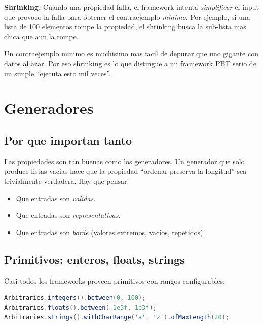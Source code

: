 \documentclass[12pt,a4paper]{article}
\begin{document}
\begin{definicionbox}
\textbf{Shrinking.} Cuando una propiedad falla, el framework intenta \emph{simplificar} el
input que provoco la falla para obtener el contraejemplo \emph{minimo}. Por ejemplo, si una
lista de 100 elementos rompe la propiedad, el shrinking busca la sub-lista mas chica que aun
la rompe.
\end{definicionbox}

\begin{ideabox}
Un contraejemplo minimo es muchisimo mas facil de depurar que uno gigante con datos al azar.
Por eso shrinking es lo que distingue a un framework PBT serio de un simple ``ejecuta esto
mil veces''.
\end{ideabox}

\section{Generadores}

\subsection{Por que importan tanto}

Las propiedades son tan buenas como los generadores. Un generador que solo produce listas
vacias hace que la propiedad ``ordenar preserva la longitud'' sea trivialmente verdadera. Hay
que pensar:

\begin{itemize}
  \item Que entradas son \emph{validas}.
  \item Que entradas son \emph{representativas}.
  \item Que entradas son \emph{borde} (valores extremos, vacios, repetidos).
\end{itemize}

\subsection{Primitivos: enteros, floats, strings}

Casi todos los frameworks proveen primitivos con rangos configurables:

\begin{lstlisting}[style=codestyle,language=Java]
Arbitraries.integers().between(0, 100);
Arbitraries.floats().between(-1e3f, 1e3f);
Arbitraries.strings().withCharRange('a', 'z').ofMaxLength(20);
\end{lstlisting}
\end{document}
